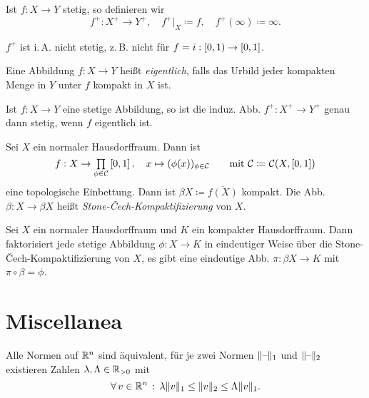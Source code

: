 \documentclass{cheat-sheet}
\begin{document}
\begin{nota}
  Ist $f : X \to Y$ stetig, so definieren wir
  \[ f^+ : X^+ \to Y^+, \quad f^+|_X \coloneqq f, \quad f^+(\infty) \coloneqq \infty. \]
\end{nota}

\begin{bem}
  $f^+$ ist i.\,A. nicht stetig, z.\,B. nicht für $f = i : \left[ 0, 1 \right) \to \left[ 0, 1 \right]$.
\end{bem}

\begin{defn}
  Eine Abbildung $f : X \to Y$ heißt \emph{eigentlich}, falls das Urbild jeder kompakten Menge in $Y$ unter $f$ kompakt in $X$ ist.
\end{defn}

\begin{prop}
  Ist $f : X \to Y$ eine stetige Abbildung, so ist die induz. Abb. $f^+ : X^+ \to Y^+$ genau dann stetig, wenn $f$ eigentlich ist.
\end{prop}


\begin{defn}
  Sei $X$ ein normaler Hausdorffraum. Dann ist
  \[
    f : X \to \prod_{\phi \in \mathcal{C}} \I, \quad x \mapsto (\phi(x))_{\phi \in \mathcal{C}}
    \qquad \text{mit } \mathcal{C} \coloneqq \mathcal{C}(X, \I)
  \]
  eine topologische Einbettung. Dann ist $\beta X \coloneqq \overline{f(X)}$ kompakt. Die Abb. $\beta : X \to \beta X$ heißt \emph{Stone-Čech-Kompaktifizierung} von $X$.
\end{defn}

\begin{prop}
  Sei $X$ ein normaler Hausdorffraum und $K$ ein kompakter Hausdorffraum. Dann faktorisiert jede stetige Abbildung $\phi : X \to K$ in eindeutiger Weise über die Stone-Čech-Kompaktifizierung von $X$, \dh{} es gibt eine eindeutige Abb. $\pi : \beta X \to K$ mit $\pi \circ \beta = \phi$.
\end{prop}

\section{Miscellanea}


\begin{lem}
  Alle Normen auf $\mathbb{R}^n$ sind äquivalent, \dh{} für je zwei Normen $\lVert\text{--}\rVert_1$ und $\lVert\text{--}\rVert_2$ existieren Zahlen $\lambda, \Lambda \in \mathbb{R}_{> 0}$ mit
  \[ \forall \, {v \in \mathbb{R}^n} \,:\, \lambda \lVert v\rVert_1 \leq \lVert v\rVert_2 \leq \Lambda \lVert v\rVert_1. \]
\end{lem}
\end{document}
